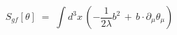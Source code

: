 \begin{equation}\label{eq:defsgf}
S_{gf}[\theta] \;=\; \int d^3x \,( - \frac{1}{2\lambda} b^2
\,+\, b \cdot \partial_\mu \theta_\mu )  
\end{equation}


